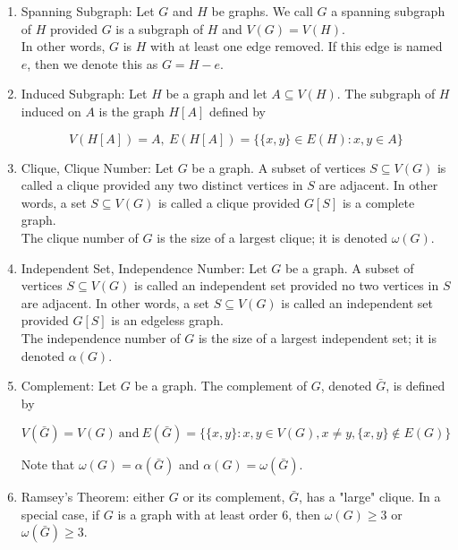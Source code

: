 \documentclass{article}
\begin{document}
\begin{enumerate}
    \item Spanning Subgraph: Let $G$ and $H$ be graphs. We call $G$ a spanning subgraph of $H$ provided $G$ is a subgraph of $H$ and $V(G)=V(H)$.\\
    
    In other words, $G$ is $H$ with at least one edge removed. If this edge is named $e$, then we denote this as $G=H-e$.
    
    \item Induced Subgraph: Let $H$ be a graph and let $A\subseteq V(H)$. The subgraph of $H$ induced on $A$ is the graph $H[A]$ defined by 
    
    \[V(H[A])=A, \: E(H[A])=\{\{x,y\}\in E(H): x,y\in A\}\]
    
    \item Clique, Clique Number: Let $G$ be a graph. A subset of vertices $S\subseteq V(G)$ is called a clique provided any two distinct vertices in $S$ are adjacent. In other words, a set $S\subseteq V(G)$ is called a clique provided $G[S]$ is a complete graph.\\
    
    The clique number of $G$ is the size of a largest clique; it is denoted $\omega (G)$.
    
    \item Independent Set, Independence Number: Let $G$ be a graph. A subset of vertices $S\subseteq V(G)$ is called an independent set provided no two vertices in $S$ are adjacent. In other words, a set $S\subseteq V(G)$ is called an independent set provided $G[S]$ is an edgeless graph.\\
    
    The independence number of $G$ is the size of a largest independent set; it is denoted $\alpha (G)$. 
    
    \item Complement: Let $G$ be a graph. The complement of $G$, denoted $\bar G$, is defined by 
    
    \[V(\bar G)=V(G)\: \text{and}\: E(\bar G)=\{\{x,y\}: x,y \in V(G), x\neq y, \{x,y\}\not\in E(G)\}\]
    
    Note that $\omega(G)=\alpha(\bar G)$ and $\alpha(G)=\omega(\bar G)$.
    
    \item Ramsey's Theorem: either $G$ or its complement, $\bar G$, has a "large" clique. In a special case, if $G$ is a graph with at least order $6$, then $\omega(G)\geq 3$ or $\omega(\bar G)\geq 3$.
    

\end{enumerate}
\end{document}
